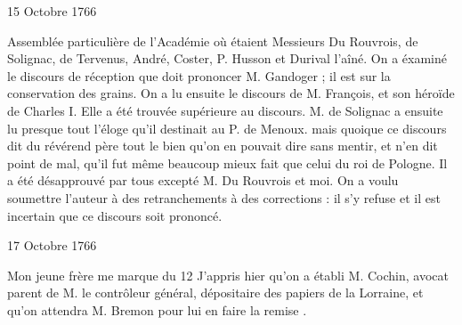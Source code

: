                      \begin{diary}{15 Octobre 1766}{}

                         Assemblée particulière de l’Académie
                           où étaient Messieurs
                           Du Rouvrois, de Solignac,
                           de Tervenus, André, Coster, P. Husson et
                           Durival l’aîné. On a éxaminé
                           le
                           discours de réception que doit
                           prononcer
                           M. Gandoger ; il est sur la
                           conservation
                           des grains. On a lu ensuite le discours
                              de M.
                                 François, et son héroïde de Charles I.
                           Elle a été trouvée supérieure au discours.
                           M. de Solignac a ensuite lu
                           presque
                           tout l’éloge qu’il destinait au P. de
                              Menoux.
                           mais quoique ce discours dit du révérend père tout
                           le bien qu’on en pouvait dire sans mentir,
                           et n’en dit point de mal, qu’il fut même
                           beaucoup mieux fait que celui du roi de Pologne.
                           Il a été désapprouvé par tous excepté
                           M. Du Rouvrois et moi. On a
                           voulu
                           soumettre l’auteur à des retranchements
                           à des corrections : il s’y refuse et il
                           est incertain que ce discours soit prononcé. \bigskip


                     \end{diary}

                     \begin{diary}{17 Octobre 1766}{}


                           Mon jeune frère me marque
                           du 12  \og
                              J’appris hier qu’on a établi M.
                                 Cochin, avocat parent
                              de M. le contrôleur
                                 général, dépositaire
                              des papiers de la
                              Lorraine, et qu’on attendra
                              M. Bremon pour lui en faire la
                              remise  \fg{}. \bigskip


                     \end{diary}

